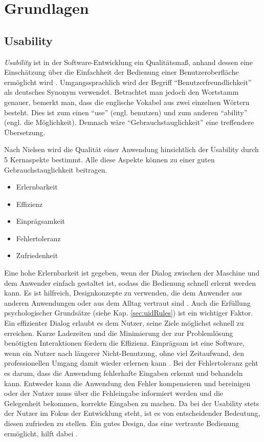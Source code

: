 \chapter{Grundlagen}
\section{Usability} \label{sec:usability}
\textit{Usability} ist in der Software-Entwicklung ein Qualitätsmaß, anhand dessen eine Einschätzung über die Einfachheit der Bedienung einer Benutzeroberfläche ermöglicht wird \cite{Nielsen2012}. Umgangssprachlich wird der Begriff \enquote{Benutzerfreundlichkeit} als deutsches Synonym verwendet. Betrachtet man jedoch den Wortstamm genauer, bemerkt man, dass die englische Vokabel aus zwei einzelnen Wörtern besteht. Dies ist zum einen \enquote{use} (engl. benutzen) und zum anderen \enquote{ability} (engl. die Möglichkeit).  Demnach wäre \enquote{Gebrauchstauglichkeit} eine treffendere Übersetzung.\cite{Rampl2007}\par
Nach Nielsen wird die Qualität einer Anwendung hinsichtlich der Usability durch 5 Kernaspekte bestimmt. Alle diese Aspekte können zu einer guten Gebrauchstauglichkeit beitragen.
\begin{itemize}
	\item Erlernbarkeit
	\item Effizienz
	\item Einprägsamkeit
	\item Fehlertoleranz
	\item Zufriedenheit \cite{Nielsen2012}
\end{itemize}
Eine hohe Erlernbarkeit ist gegeben, wenn der Dialog zwischen der Maschine und dem Anwender einfach gestaltet ist, sodass die Bedienung schnell erlernt werden kann. Es ist hilfreich, Designkonzepte zu verwenden, die dem Anwender aus anderen Anwendungen oder aus dem Alltag vertraut sind \cite[Learnability]{UsabilityFirstGlossary}. Auch die Erfüllung psychologischer Grundsätze (siehe Kap. \ref{sec:uidRules}) ist ein wichtiger Faktor. Ein effizienter Dialog erlaubt es dem Nutzer, seine Ziele möglichst schnell zu erreichen. Kurze Ladezeiten und die Minimierung der zur Problemlösung benötigten Interaktionen fördern die Effizienz. Einprägsam ist eine Software, wenn ein Nutzer nach längerer Nicht-Benutzung, ohne viel Zeitaufwand, den professionellen Umgang damit wieder erlernen kann \cite{Nielsen2012}. Bei der Fehlertoleranz geht es darum, dass die Anwendung fehlerhafte Eingaben erkennt und behandeln kann. Entweder kann die Anwendung den Fehler kompensieren und bereinigen oder der Nutzer muss über die Fehleingabe informiert werden und die Gelegenheit bekommen, korrekte Eingaben zu machen. Da bei der Usability stets der Nutzer im Fokus der Entwicklung steht, ist es von entscheidender Bedeutung, diesen zufrieden zu stellen. Ein gutes Design, das eine vertraute Bedienung ermöglicht, hilft dabei \cite{Nielsen2012}. \par
